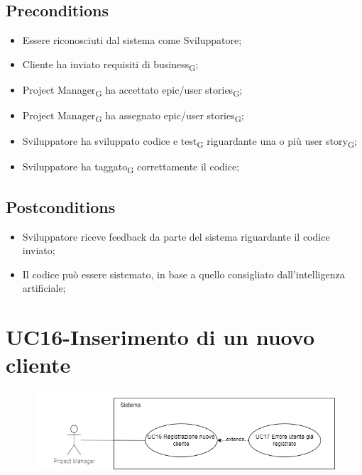 \documentclass{article}
\begin{document}
    \subsection*{Preconditions}
        \begin{itemize}
            \item Essere riconosciuti dal sistema come Sviluppatore;
            \item Cliente ha inviato requisiti di business\textsubscript{G};
            \item Project Manager\textsubscript{G} ha accettato epic/user stories\textsubscript{G};
            \item Project Manager\textsubscript{G} ha assegnato epic/user stories\textsubscript{G};
            \item Sviluppatore ha sviluppato codice e test\textsubscript{G} riguardante una o più user story\textsubscript{G};
            \item Sviluppatore ha taggato\textsubscript{G} correttamente il codice;
        \end{itemize}
        
    \subsection*{Postconditions}
        \begin{itemize}
            \item Sviluppatore riceve feedback da parte del sistema riguardante il codice inviato;
            \item Il codice può essere sistemato, in base a quello consigliato dall'intelligenza artificiale;
        \end{itemize}
    

        
\section{UC16-Inserimento di un nuovo cliente}
    \begin{figure}[h]
      \centering
      \includegraphics{./imgUML/UC16.png}
      \label{fig:immagine}
    \end{figure}
    
\end{document}
